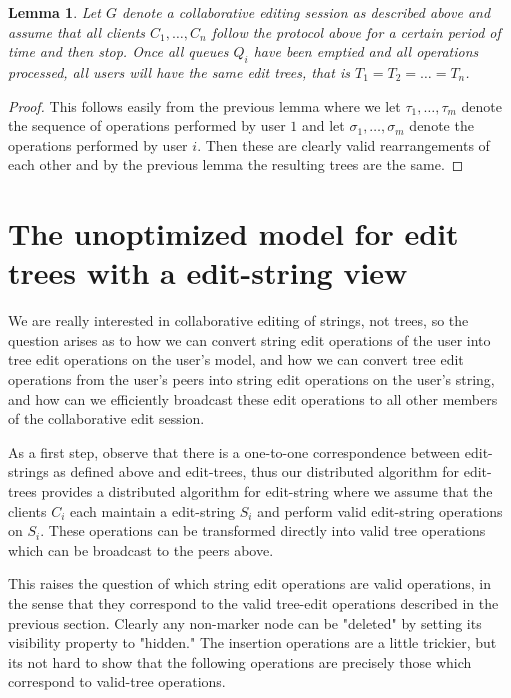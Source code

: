 \documentclass{amsart}
\newtheorem{lemma}[theorem]{Lemma}
\begin{document}
\begin{lemma}
Let $G$ denote a collaborative editing session as described
above and assume that all clients $C_1,\ldots,C_n$ follow the protocol above
for a certain period of time and then stop. Once all queues $Q_i$ have been
emptied and all operations processed, all users will have the same edit
trees, that is $T_1=T_2=\ldots=T_n$.
\end{lemma}

\begin{proof}
This follows easily from the previous lemma where we let $\tau_1,\ldots,\tau_m$
denote the sequence of operations performed by user $1$ and let 
$\sigma_1,\ldots,\sigma_m$ denote the operations performed by user $i$. Then
these are clearly valid rearrangements of each other and by the previous
lemma the resulting trees are the same.
\end{proof}



\section{The unoptimized model for edit trees with a edit-string view}
We are really interested in collaborative editing of strings, not trees, so the
question arises as to how we can convert string edit operations of the user
into tree edit operations on the user's model, and how we can convert tree edit
operations from the user's peers into string edit operations on the user's string,
and how can we efficiently broadcast these edit operations to all other members
of the collaborative edit session.

As a first step, observe that there is a one-to-one correspondence between
edit-strings as defined above and edit-trees, thus our distributed algorithm
for edit-trees provides a distributed algorithm for edit-string where we
assume that the clients $C_i$ each maintain a edit-string $S_i$ and perform valid
edit-string operations on $S_i$. These operations can be transformed directly
into valid tree operations which can be broadcast to the peers above. 

This raises the question of which string edit operations are valid operations,
in the sense that they correspond to the valid tree-edit operations described
in the previous section.  Clearly any non-marker node can be "deleted" by setting
its visibility property to "hidden."  The insertion operations are a little
trickier, but its not hard to show that the following operations are precisely
those which correspond to valid-tree operations. 
\end{document}
